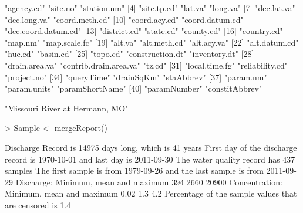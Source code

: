 \documentclass[a4paper,11pt]{article}
\begin{document}
\begin{Schunk}
\begin{Soutput}
 [1] "agency.cd"             "site.no"               "station.nm"           
 [4] "site.tp.cd"            "lat.va"                "long.va"              
 [7] "dec.lat.va"            "dec.long.va"           "coord.meth.cd"        
[10] "coord.acy.cd"          "coord.datum.cd"        "dec.coord.datum.cd"   
[13] "district.cd"           "state.cd"              "county.cd"            
[16] "country.cd"            "map.nm"                "map.scale.fc"         
[19] "alt.va"                "alt.meth.cd"           "alt.acy.va"           
[22] "alt.datum.cd"          "huc.cd"                "basin.cd"             
[25] "topo.cd"               "construction.dt"       "inventory.dt"         
[28] "drain.area.va"         "contrib.drain.area.va" "tz.cd"                
[31] "local.time.fg"         "reliability.cd"        "project.no"           
[34] "queryTime"             "drainSqKm"             "staAbbrev"            
[37] "param.nm"              "param.units"           "paramShortName"       
[40] "paramNumber"           "constitAbbrev"        
\end{Soutput}
\begin{Soutput}
[1] "Missouri River at Hermann, MO"
\end{Soutput}
\begin{Sinput}
> Sample <- mergeReport()
\end{Sinput}
\begin{Soutput}
 Discharge Record is 14975 days long, which is 41 years
 First day of the discharge record is 1970-10-01 and last day is 2011-09-30
 The water quality record has 437 samples
 The first sample is from 1979-09-26 and the last sample is from 2011-09-29
 Discharge: Minimum, mean and maximum 394 2660 20900
 Concentration: Minimum, mean and maximum 0.02 1.3 4.2
 Percentage of the sample values that are censored is 1.4 %
\end{Soutput}
\end{Schunk}

\newpage
\end{document}
